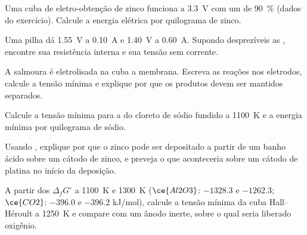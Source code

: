 \begin{exercise}[$\star\star$]\label{exo:b2:batteries-electrolysis:6}
Uma cuba de eletro-obtenção de zinco funciona a \qty{3.3}{V} com um  de 90~\% (dados do exercício). Calcule a energia elétrica por
quilograma de zinco.
\end{exercise}

\begin{exercise}[$\star\star$]\label{exo:b2:batteries-electrolysis:7}
Uma pilha dá \qty{1.55}{V} a \qty{0.10}{A} e \qty{1.40}{V} a \qty{0.60}{A}.
Supondo desprezíveis as , encontre sua resistência interna e sua
tensão sem corrente.
\end{exercise}

\begin{exercise}[$\star\star$]\label{exo:b2:batteries-electrolysis:8}
A salmoura é eletrolisada na cuba a membrana. Escreva as reações nos
eletrodos, calcule a tensão mínima e explique por que os produtos devem ser
mantidos separados.
\end{exercise}

\begin{exercise}[$\star\star$]\label{exo:b2:batteries-electrolysis:9}
Calcule a tensão mínima para a  do cloreto de sódio fundido a
\qty{1100}{K} e a energia mínima por quilograma de sódio.
\end{exercise}

\begin{exercise}[$\star\star\star$]\label{exo:b2:batteries-electrolysis:10}
Usando , explique por que o zinco pode ser
depositado a partir de um banho ácido sobre um cátodo de zinco, e preveja o
que aconteceria sobre um cátodo de platina no início da deposição.
\end{exercise}

\begin{exercise}[$\star\star\star$]\label{exo:b2:batteries-electrolysis:11}
A partir dos $\Delta_f G^\circ$ a \qty{1100}{K} e \qty{1300}{K} ($\ce{Al2O3}$: $-1328.3$ e
$-1262.3$; $\ce{CO2}$: $-396.0$ e $-396.2$ \unit{kJ/mol}), calcule a tensão
mínima da cuba Hall--Héroult a \qty{1250}{K} e compare com um ânodo inerte,
sobre o qual seria liberado oxigênio.
\end{exercise}

